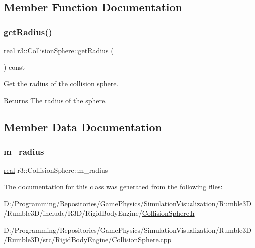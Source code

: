 \subsection{Member Function Documentation}
\mbox{\label{classr3_1_1_collision_sphere_aa3b7687165b34ab82b3bedb0884cc65b}} 
\subsubsection{\texorpdfstring{get\+Radius()}{getRadius()}}
{\footnotesize\ttfamily \mbox{\hyperlink{namespacer3_ab2016b3e3f743fb735afce242f0dc1eb}{real}} r3\+::\+Collision\+Sphere\+::get\+Radius (\begin{DoxyParamCaption}{ }\end{DoxyParamCaption}) const}



Get the radius of the collision sphere. 

\begin{DoxyReturn}{Returns}
The radius of the sphere. 
\end{DoxyReturn}


\subsection{Member Data Documentation}
\mbox{\label{classr3_1_1_collision_sphere_abc9e3dcae422b4732a288fa19d89d466}} 
\subsubsection{\texorpdfstring{m\+\_\+radius}{m\_radius}}
{\footnotesize\ttfamily \mbox{\hyperlink{namespacer3_ab2016b3e3f743fb735afce242f0dc1eb}{real}} r3\+::\+Collision\+Sphere\+::m\+\_\+radius\hspace{0.3cm}{\ttfamily [protected]}}



The documentation for this class was generated from the following files\+:\begin{DoxyCompactItemize}
\item 
D\+:/\+Programming/\+Repositories/\+Game\+Physics/\+Simulation\+Visualization/\+Rumble3\+D/\+Rumble3\+D/include/\+R3\+D/\+Rigid\+Body\+Engine/\mbox{\hyperlink{_collision_sphere_8h}{Collision\+Sphere.\+h}}\item 
D\+:/\+Programming/\+Repositories/\+Game\+Physics/\+Simulation\+Visualization/\+Rumble3\+D/\+Rumble3\+D/src/\+Rigid\+Body\+Engine/\mbox{\hyperlink{_collision_sphere_8cpp}{Collision\+Sphere.\+cpp}}\end{DoxyCompactItemize}
